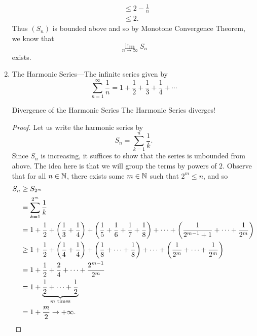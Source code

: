 \documentclass[class=article, crop=false]{standalone}
\begin{document}
\begin{enumerate}[label=\arabic*)]
\begin{align*}
          &\leq 2 - \frac{1}{n} \\
          &\leq 2.
    \end{align*}
    Thus $(S_n)$ is bounded above and so by Monotone Convergence Theorem, we know that
    \[
      \lim_{n\to \infty} S_n
    \]
    exists.
    \newpage
    \item The Harmonic Series---The infinite series given by
    \[
      \sum_{n=1}^{\infty} \frac{1}{n} = 1 + \frac{1}{2} + \frac{1}{3} + \frac{1}{4} + \dotsb
    \]
    \begin{theorem}{Divergence of the Harmonic Series}
      The Harmonic Series diverges!
      \begin{proof}
        Let us write the harmonic series by
        \[
          S_n = \sum_{k=1}^{n} \frac{1}{k}.
        \]
        Since $S_n$ is increasing, it suffices to show that the series is unbounded from above. The idea here is that we will group the terms by powers of $2$. Observe that for all $n\in\mathbb{N}$, there exists some $m\in\mathbb{N}$ such that $2^{m} \leq n$, and so
        \begin{align*}
          S_n &\geq S_{2^m} \\
              &= \sum_{k=1}^{2^m} \frac{1}{k} \\
              &= 1 + \frac{1}{2} + \left( \frac{1}{3} + \frac{1}{4} \right) + \left( \frac{1}{5} + \frac{1}{6} + \frac{1}{7} + \frac{1}{8} \right) + \dotsb + \left( \frac{1}{2^{m - 1} + 1} + \dotsb + \frac{1}{2^m} \right) \\
              &\geq 1 + \frac{1}{2} + \left( \frac{1}{4} + \frac{1}{4} \right) + \left( \frac{1}{8} + \dotsb + \frac{1}{8} \right) + \dotsb + \left( \frac{1}{2^m} + \dotsb + \frac{1}{2^m} \right) \\
              &= 1 + \frac{1}{2} + \frac{2}{4} + \dotsb + \frac{2^{m - 1}}{2^m} \\
              &= 1 + \underbrace{\frac{1}{2} + \dotsb + \frac{1}{2}}_{m\text{ times}} \\
              &= 1 + \frac{m}{2}\to+\infty.
        \end{align*}
      \end{proof}
    \end{theorem}
  \end{enumerate}
  \newpage
\end{document}
